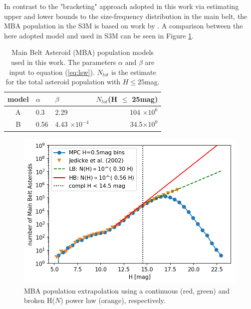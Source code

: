 In contrast to the "bracketing" approach adopted in this work via estimating upper and lower bounds to the size-frequency distribution in the main belt, the \gls{MBA} population in the S3M is based on work by \citet{jedicke2002}. A comparison between the here adopted model and \citet{jedicke2002} used in S3M can be seen in Figure \ref{fig:mba_pop}.
\begin{table}[t!]
\begin{center}
\begin{tabular}{cllr}
\hline
model & $\alpha$ & $\beta$ & $N_{tot}$(H $\le$ 25mag) \\
\hline
A & 0.3 &  2.29 & 104 $\times 10^{6}$ \\
B & 0.56 &4.43 $\times 10^{-4}$ & 34.5$\times 10^{9}$\\
\hline
\end{tabular}
\end{center}
\caption{Main Belt Asteroid (\gls{MBA}) population models used in this work. The parameters $\alpha$ and $\beta$ are input to equation (\ref{eq:lsw}). $N_{tot}$ is the estimate for the total asteroid population with $H\le 25$mag. }
\label{tab:mbapop}
\end{table}
\begin{figure}[b!]
\begin{center}
\includegraphics[scale=.8]{figs/mpc_population_4.png}
\end{center}
\caption{MBA population extrapolation using a continuous (red, green) and broken H($N$) power law (orange), respectively.}
\label{fig:mba_pop}       %
\end{figure}
%

